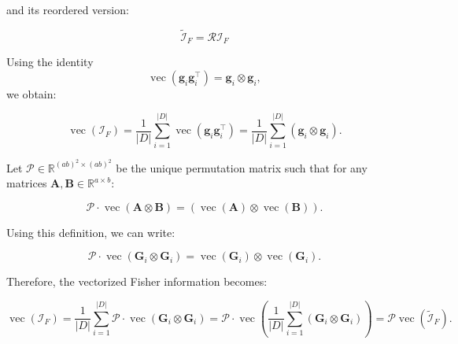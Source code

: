 \documentclass{article}
\DeclareMathOperator{\vect}{vec}
\begin{document}
and its reordered version:
 
\begin{equation}
\label{eq:reordered_IF}
   \tilde{\mathcal{I}}_F = \mathcal{R} \mathcal{I}_F
\end{equation}




Using the identity
$$
\operatorname{vec}(\bm{g}_i \bm{g}_i^\top) = \bm{g}_i \otimes \bm{g}_i,
$$
we obtain:

\begin{equation}
\operatorname{vec}(\mathcal{I}_F) 
= \frac{1}{|D|} \sum_{i=1}^{|D|} \operatorname{vec}(\bm{g}_i \bm{g}_i^\top) 
= \frac{1}{|D|} \sum_{i=1}^{|D|} (\bm{g}_i \otimes \bm{g}_i).
\end{equation}

Let \( \mathcal{P} \in \mathbb{R}^{(ab)^2 \times (ab)^2} \) be the unique permutation matrix such that for any matrices \( \mathbf{A}, \mathbf{B} \in \mathbb{R}^{a \times b} \):

\begin{equation}
\mathcal{P} \cdot \operatorname{vec}(\mathbf{A} \otimes \mathbf{B}) = (\operatorname{vec}(\mathbf{A}) \otimes \operatorname{vec}(\mathbf{B})).
\end{equation}

Using this definition, we can write:

\begin{equation}
\mathcal{P} \cdot \operatorname{vec}(\mathbf{G}_i \otimes \mathbf{G}_i) = \operatorname{vec}(\mathbf{G}_i) \otimes \operatorname{vec}(\mathbf{G}_i).
\end{equation}

Therefore, the vectorized Fisher information becomes:

\begin{equation}
\operatorname{vec}(\mathcal{I}_F) = \frac{1}{|D|} \sum_{i=1}^{|D|} \mathcal{P} \cdot \operatorname{vec}(\mathbf{G}_i \otimes \mathbf{G}_i) = \mathcal{P} \cdot \operatorname{vec} \left( \frac{1}{|D|} \sum_{i=1}^{|D|}(\mathbf{G}_i \otimes \mathbf{G}_i) \right) = \mathcal{P}  \vect(\tilde{\mathcal{I}}_F) .
\end{equation}
\end{document}
